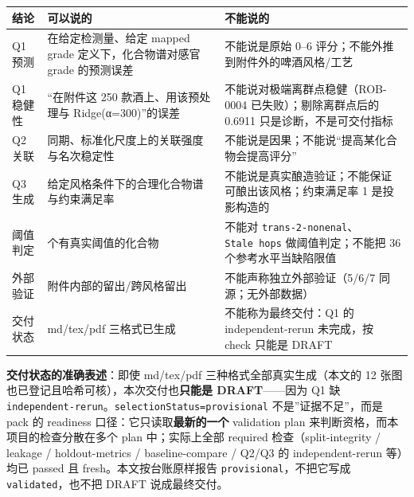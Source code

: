 \documentclass[
  11pt,
]{ctexart}
\newcounter{none} %
\begin{document}
{\def\LTcaptype{none} %
\begin{longtable}[]{@{}
  >{\raggedright\arraybackslash}p{}
  >{\raggedright\arraybackslash}p{}
  >{\raggedright\arraybackslash}p{}@{}}
\toprule\noalign{}
\begin{minipage}[b]{\linewidth}\raggedright
结论
\end{minipage} & \begin{minipage}[b]{\linewidth}\raggedright
可以说的
\end{minipage} & \begin{minipage}[b]{\linewidth}\raggedright
不能说的
\end{minipage} \\
\midrule\noalign{}
\endhead
\bottomrule\noalign{}
\endlastfoot
Q1 预测 & 在给定检测量、给定 mapped grade 定义下，化合物谱对感官 grade
的预测误差 & 不能说是原始 0--6 评分；不能外推到附件外的啤酒风格/工艺 \\
Q1 稳健性 & ``在附件这 250 款酒上、用该预处理与 Ridge(α=300)''的误差 &
不能说对极端离群点稳健（ROB-0004 已失败）；剔除离群点后的 0.6911
只是诊断，不是可交付指标 \\
Q2 关联 & 同期、标准化尺度上的关联强度与名次稳定性 &
不能说是因果；不能说``提高某化合物会提高评分'' \\
Q3 生成 & 给定风格条件下的合理化合物谱与约束满足率 &
不能说是真实酿造验证；不能保证可酿出该风格；约束满足率 1 是投影构造的 \\
阈值判定 & 7 个有真实阈值的化合物 & 不能对
\texttt{trans-2-nonenal}、\texttt{Stale\ hops} 做阈值判定；不能把 36
个参考水平当缺陷限值 \\
外部验证 & 附件内部的留出/跨风格留出 & 不能声称独立外部验证（5/6/7
同源；无外部数据） \\
交付状态 & md/tex/pdf 三格式已生成 & 不能称为最终交付：Q1 的
independent-rerun 未完成，按 check 只能是 DRAFT \\
\end{longtable}
}

\textbf{交付状态的准确表述}：即使 md/tex/pdf
三种格式全部真实生成（本文的 12
张图也已登记且哈希可核），本次交付也\textbf{只能是 DRAFT}------因为 Q1
缺 \texttt{independent-rerun}。\texttt{selectionStatus=provisional}
不是''证据不足''，而是 pack 的 readiness
口径：它只读取\textbf{最新的一个} validation plan
来判断资格，而本项目的检查分散在多个 plan 中；实际上全部 required
检查（split-integrity / leakage / holdout-metrics / baseline-compare /
Q2/Q3 的 independent-rerun 等）均已 passed 且 fresh。本文按台账原样报告
\texttt{provisional}，不把它写成 \texttt{validated}，也不把 DRAFT
说成最终交付。
\end{document}
